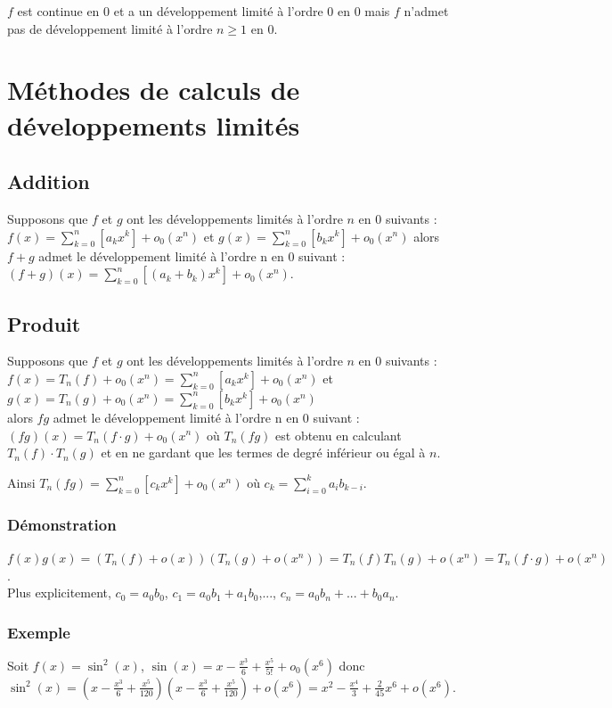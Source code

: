 \documentclass[a4paper,10pt]{book} %
\newcommand{\dl}{développement limité }
\begin{document}
$f$ est continue en 0 et a un \dl à l'ordre 0 en 0 mais $f$ n'admet pas de \dl à l'ordre $n\geq 1$ en 0.

\newpage

\section{Méthodes de calculs de développements limités}
\subsection{Addition}
Supposons que $f$ et $g$ ont les développements limités à l'ordre $n$ en 0 suivants :\\
$\displaystyle f(x)=\sum\limits_{k=0}^{n}[a_kx^{k}]+o_0(x^{n})$ et
$\displaystyle g(x)=\sum\limits_{k=0}^{n}[b_kx^{k}]+o_0(x^{n})$ alors $f+g$ admet le \dl à l'ordre n en 0 suivant :
$\displaystyle (f+g)(x)=\sum\limits_{k=0}^{n}[(a_k+b_k)x^{k}]+o_0(x^{n})$.

\subsection{Produit}
Supposons que $f$ et $g$ ont les développements limités à l'ordre $n$ en 0 suivants :\\
$\displaystyle f(x)=T_n(f)+o_0(x^{n})=\sum\limits_{k=0}^{n}[a_kx^{k}]+o_0(x^{n})$ et
$\displaystyle g(x)=T_n(g)+o_0(x^{n})=\sum\limits_{k=0}^{n}[b_kx^{k}]+o_0(x^{n})$\\
alors $fg$ admet le \dl à l'ordre n en 0 suivant :\\
$(fg)(x)=T_n(f\cdot g)+o_0(x^n)$ où $T_n(fg)$ est obtenu en calculant $T_n(f)\cdot T_n(g)$ et en ne gardant que les termes de degré inférieur ou égal à $n$.

Ainsi $\displaystyle T_n(fg)=\sum\limits_{k=0}^{n}[c_kx^{k}]+o_0(x^{n})$ où $\displaystyle c_k=\sum_{i=0}^{k}a_ib_{k-i}$.

\subsubsection{Démonstration}
$f(x)g(x)=(T_n(f)+o(x))(T_n(g)+o(x^n))=T_n(f)T_n(g)+o(x^n)=T_n(f\cdot g)+o(x^n)$.\\

Plus explicitement, $c_0=a_0b_0$, $c_1=a_0b_1+a_1b_0$,..., $c_n=a_0b_n+...+b_0a_n$.

\subsubsection{Exemple}
Soit $f(x)=\sin^2(x)$, $\sin(x)=x-\frac{x^3}{6}+\frac{x^5}{5!}+o_0(x^6)$ donc\\
$\sin^2(x)=(x-\frac{x^3}{6}+\frac{x^5}{120})(x-\frac{x^3}{6}+\frac{x^5}{120})+o(x^6)=x^2-\frac{x^4}{3}+\frac{2}{45}x^6+o(x^6)$.\\
\end{document}
